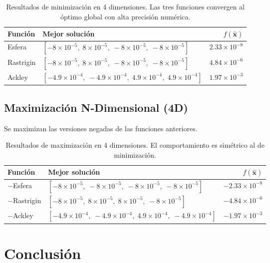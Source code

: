 \documentclass[11pt]{article}
\begin{document}
\begin{table}[H]
\centering
\begin{tabular}{lp{8.5cm}r}
\hline\hline
Funci\'on & Mejor soluci\'on & $f(\hat{\mathbf{x}})$ \\
\hline
Esfera    & $[-8{\times}10^{-5},\;8{\times}10^{-5},\;-8{\times}10^{-5},\;-8{\times}10^{-5}]$ & $2.33\times10^{-8}$ \\[3pt]
Rastrigin & $[-8{\times}10^{-5},\;8{\times}10^{-5},\;-8{\times}10^{-5},\;-8{\times}10^{-5}]$ & $4.84\times10^{-6}$ \\[3pt]
Ackley    & $[-4.9{\times}10^{-4},\;-4.9{\times}10^{-4},\;4.9{\times}10^{-4},\;4.9{\times}10^{-4}]$ & $1.97\times10^{-3}$ \\
\hline\hline
\end{tabular}
\caption{Resultados de minimizaci\'on en 4 dimensiones. Las tres funciones convergen al \'optimo global con alta precisi\'on num\'erica.}
\end{table}

\subsection{Maximizaci\'on N-Dimensional (4D)}

Se maximizan las versiones negadas de las funciones anteriores.

\begin{table}[H]
\centering
\begin{tabular}{lp{8.5cm}r}
\hline\hline
Funci\'on & Mejor soluci\'on & $f(\hat{\mathbf{x}})$ \\
\hline
$-$Esfera    & $[-8{\times}10^{-5},\;-8{\times}10^{-5},\;-8{\times}10^{-5},\;-8{\times}10^{-5}]$ & $-2.33\times10^{-8}$ \\[3pt]
$-$Rastrigin & $[-8{\times}10^{-5},\;8{\times}10^{-5},\;8{\times}10^{-5},\;-8{\times}10^{-5}]$   & $-4.84\times10^{-6}$ \\[3pt]
$-$Ackley    & $[-4.9{\times}10^{-4},\;-4.9{\times}10^{-4},\;4.9{\times}10^{-4},\;-4.9{\times}10^{-4}]$ & $-1.97\times10^{-3}$ \\
\hline\hline
\end{tabular}
\caption{Resultados de maximizaci\'on en 4 dimensiones. El comportamiento es sim\'etrico al de minimizaci\'on.}
\end{table}

\section{Conclusi\'on}
\end{document}
